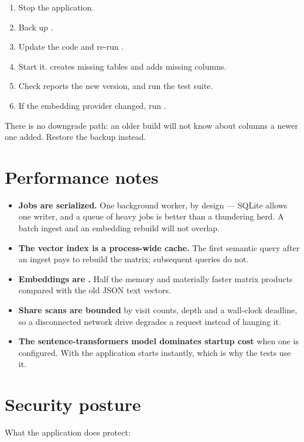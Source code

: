 \begin{enumerate}
\item Stop the application.
\item Back up .
\item Update the code and re-run .
\item Start it.  creates missing tables and adds missing
columns.
\item Check  reports the new version, and run the test suite.
\item If the embedding provider changed, run .
\end{enumerate}

There is no downgrade path: an older build will not know about columns a newer
one added. Restore the backup instead.

\section{Performance notes}

\begin{itemize}
\item \textbf{Jobs are serialized.} One background worker, by design --- SQLite
allows one writer, and a queue of heavy jobs is better than a thundering herd. A
batch ingest and an embedding rebuild will not overlap.
\item \textbf{The vector index is a process-wide cache.} The first semantic query
after an ingest pays to rebuild the matrix; subsequent queries do not.
\item \textbf{Embeddings are .} Half the memory and materially
faster matrix products compared with the old JSON text vectors.
\item \textbf{Share scans are bounded} by visit counts, depth and a wall-clock
deadline, so a disconnected network drive degrades a request instead of hanging
it.
\item \textbf{The sentence-transformers model dominates startup cost} when one is
configured. With  the application starts instantly, which is
why the tests use it.
\end{itemize}

\section{Security posture}

What the application does protect:

